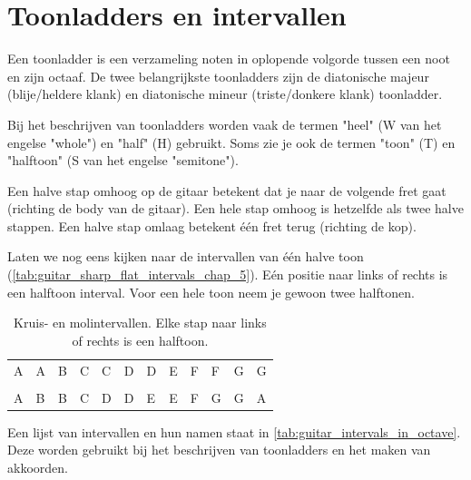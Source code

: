 \newpage

\section{Toonladders en intervallen}

Een toonladder is een verzameling noten in oplopende volgorde tussen een noot en zijn octaaf. De twee belangrijkste toonladders zijn de diatonische majeur (blije/heldere klank) en diatonische mineur (triste/donkere klank) toonladder.

Bij het beschrijven van toonladders worden vaak de termen "heel" (W van het engelse "whole") en "half" (H) gebruikt. Soms zie je ook de termen "toon" (T) en "halftoon" (S van het engelse "semitone").

Een halve stap omhoog op de gitaar betekent dat je naar de volgende fret gaat (richting de body van de gitaar). Een hele stap omhoog is hetzelfde als twee halve stappen. Een halve stap omlaag betekent één fret terug (richting de kop).

Laten we nog eens kijken naar de intervallen van één halve toon (\autoref{tab:guitar_sharp_flat_intervals_chap_5}). Eén positie naar links of rechts is een halftoon interval. Voor een hele toon neem je gewoon twee halftonen.

\begin{table}[h]
	\centering
	\begin{NiceTabular}{*{12}{P{5mm}}}
		\large{A} & \large{A\sharp} & \large{B} & \large{C} & \large{C\sharp} & \large{D} & \large{D\sharp} & \large{E} & \large{F} & \large{F\sharp} & \large{G} & \large{G\sharp} \\ \\
		\large{A} & \large{B\flat} & \large{B} & \large{C} & \large{D\flat} & \large{D} & \large{E\flat} & \large{E} & \large{F} & \large{G\flat}& \large{G} & \large{A\flat}
	\end{NiceTabular}
	\caption{Kruis- en molintervallen. Elke stap naar links of rechts is een halftoon.}
	\label{tab:guitar_sharp_flat_intervals_chap_5}
\end{table}

Een lijst van intervallen en hun namen staat in \autoref{tab:guitar_intervals_in_octave}. Deze worden gebruikt bij het beschrijven van toonladders en het maken van akkoorden.

